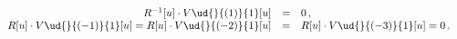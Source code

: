 \begin{equation}\label{eq:kerR}
\begin{array}{rcl}
R^{-1}[u] \cdot V\ud{}{(1)}{1}[u]& =& 0\,, \\
R[u] \cdot V\ud{}{(-1)}{1}[u] = R[u] \cdot V\ud{}{(-2)}{1}[u] &= & R[u]
\cdot V\ud{}{(-3)}{1}[u] =0\,. \
\end{array}
\end{equation}

